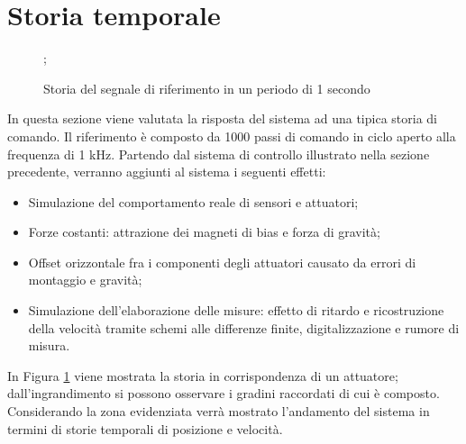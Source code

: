 \section{Storia temporale}
\begin{figure}[htb]
\footnotesize
\centering
{};
\caption{Storia del segnale di riferimento in un periodo di 1 secondo}
\label{fig:8refstory}
\end{figure}
In questa sezione viene valutata la risposta del sistema ad una tipica storia di comando. Il riferimento è composto da 1000 passi di comando in ciclo aperto alla frequenza di 1 kHz. Partendo dal sistema di controllo illustrato nella sezione precedente, verranno aggiunti al sistema i seguenti effetti:
\begin{itemize}
\item Simulazione del comportamento reale di sensori e attuatori;
\item Forze costanti: attrazione dei magneti di bias e forza di gravità;
\item Offset orizzontale fra i componenti degli attuatori causato da errori di montaggio e gravità;
\item Simulazione dell'elaborazione delle misure: effetto di ritardo e ricostruzione della velocità tramite schemi alle differenze finite, digitalizzazione e rumore di misura.

\end{itemize}
In Figura \ref{fig:8refstory} viene mostrata la storia in corrispondenza di un attuatore; dall'ingrandimento si possono osservare i gradini raccordati di cui è composto. 
Considerando la zona evidenziata verrà mostrato l'andamento del sistema in termini di storie temporali di posizione e velocità. 


